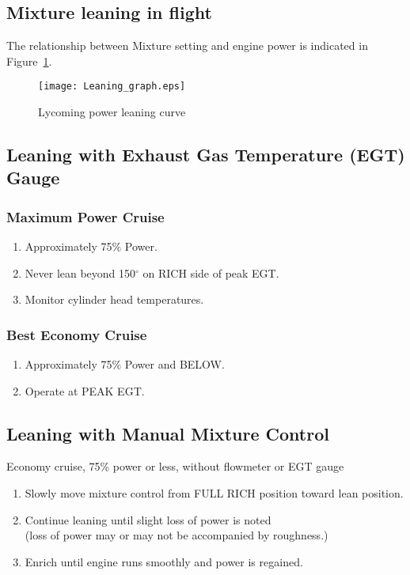 \subsection{Mixture leaning in flight}
The relationship between Mixture setting and engine power is indicated in Figure~\ref{fig:Leaning_graph}.

\begin{figure}[H]
\centering
\texttt{[image: Leaning\_graph.eps]}
\caption{Lycoming power leaning curve}
\label{fig:Leaning_graph}
\end{figure}

\subsection{Leaning with Exhaust Gas Temperature (EGT) Gauge}
\subsubsection{Maximum Power Cruise}
\begin{enumerate}[(1)]
\item Approximately 75\% Power.
\item Never lean beyond 150$^{\circ}$ on RICH side of peak EGT.
\item Monitor cylinder head temperatures.
\end{enumerate}

\subsubsection{Best Economy Cruise}
\begin{enumerate}[(1)]
\item Approximately 75\% Power and BELOW.
\item Operate at PEAK EGT.
\end{enumerate}

\subsection{Leaning with Manual Mixture Control}
Economy cruise, 75\% power or less, without flowmeter or EGT gauge
\begin{enumerate}[(1)]
\item Slowly move mixture control from FULL RICH position toward lean position.
\item Continue leaning until slight loss of power is noted\\ (loss of power may or may not be accompanied by roughness.)
\item Enrich until engine runs smoothly and power is regained.
\end{enumerate}

